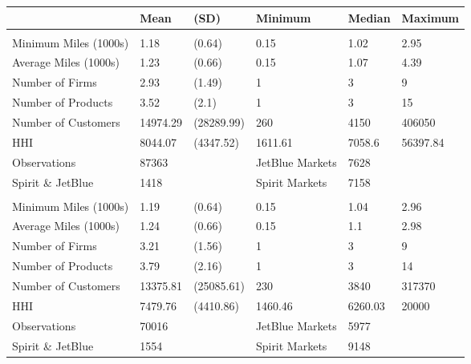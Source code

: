 
\begin{tabular}[t]{llllll}
\toprule
 & Mean & (SD) & Minimum & Median & Maximum\\
\midrule
\addlinespace[0.3em]
\multicolumn{6}{l}{\textbf{Pre-Pandemic}}\\
\hspace{1em}Minimum Miles (1000s) & 1.18 & (0.64) & 0.15 & 1.02 & 2.95\\
\hspace{1em}Average Miles (1000s) & 1.23 & (0.66) & 0.15 & 1.07 & 4.39\\
\hspace{1em}Number of Firms & 2.93 & (1.49) & 1 & 3 & 9\\
\hspace{1em}Number of Products & 3.52 & (2.1) & 1 & 3 & 15\\
\hspace{1em}Number of Customers & 14974.29 & (28289.99) & 260 & 4150 & 406050\\
\hspace{1em}HHI & 8044.07 & (4347.52) & 1611.61 & 7058.6 & 56397.84\\
\midrule
\hspace{1em}Observations & 87363 &  & JetBlue Markets & 7628 & \\
\hspace{1em}Spirit \& JetBlue & 1418 &  & Spirit Markets & 7158 & \\
\midrule
\addlinespace[0.3em]
\multicolumn{6}{l}{\textbf{Post-Pandemic}}\\
\hspace{1em}Minimum Miles (1000s) & 1.19 & (0.64) & 0.15 & 1.04 & 2.96\\
\hspace{1em}Average Miles (1000s) & 1.24 & (0.66) & 0.15 & 1.1 & 2.98\\
\hspace{1em}Number of Firms & 3.21 & (1.56) & 1 & 3 & 9\\
\hspace{1em}Number of Products & 3.79 & (2.16) & 1 & 3 & 14\\
\hspace{1em}Number of Customers & 13375.81 & (25085.61) & 230 & 3840 & 317370\\
\hspace{1em}HHI & 7479.76 & (4410.86) & 1460.46 & 6260.03 & 20000\\
\midrule
\hspace{1em}Observations & 70016 &  & JetBlue Markets & 5977 & \\
\hspace{1em}Spirit \& JetBlue & 1554 &  & Spirit Markets & 9148 & \\
\bottomrule
\end{tabular}
